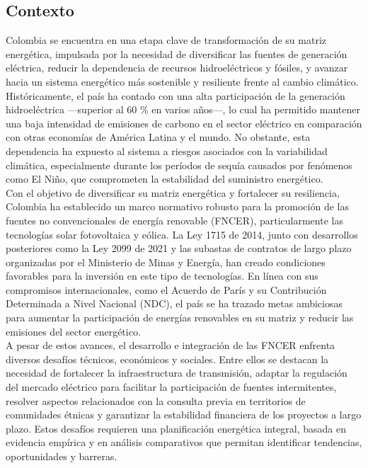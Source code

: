 \documentclass{article}
\begin{document}
\subsection{Contexto}

Colombia se encuentra en una etapa clave de transformación de su matriz energética, impulsada por la necesidad de diversificar las fuentes de generación eléctrica, reducir la dependencia de recursos hidroeléctricos y fósiles, y avanzar hacia un sistema energético más sostenible y resiliente frente al cambio climático. Históricamente, el país ha contado con una alta participación de la generación hidroeléctrica —superior al 60 \% en varios años—, lo cual ha permitido mantener una baja intensidad de emisiones de carbono en el sector eléctrico en comparación con otras economías de América Latina y el mundo. No obstante, esta dependencia ha expuesto al sistema a riesgos asociados con la variabilidad climática, especialmente durante los períodos de sequía causados por fenómenos como El Niño, que comprometen la estabilidad del suministro energético.\\

Con el objetivo de diversificar su matriz energética y fortalecer su resiliencia, Colombia ha establecido un marco normativo robusto para la promoción de las fuentes no convencionales de energía renovable (FNCER), particularmente las tecnologías solar fotovoltaica y eólica. La Ley 1715 de 2014, junto con desarrollos posteriores como la Ley 2099 de 2021 y las subastas de contratos de largo plazo organizadas por el Ministerio de Minas y Energía, han creado condiciones favorables para la inversión en este tipo de tecnologías. En línea con sus compromisos internacionales, como el Acuerdo de París y su Contribución Determinada a Nivel Nacional (NDC), el país se ha trazado metas ambiciosas para aumentar la participación de energías renovables en su matriz y reducir las emisiones del sector energético.\\

A pesar de estos avances, el desarrollo e integración de las FNCER enfrenta diversos desafíos técnicos, económicos y sociales. Entre ellos se destacan la necesidad de fortalecer la infraestructura de transmisión, adaptar la regulación del mercado eléctrico para facilitar la participación de fuentes intermitentes, resolver aspectos relacionados con la consulta previa en territorios de comunidades étnicas y garantizar la estabilidad financiera de los proyectos a largo plazo. Estos desafíos requieren una planificación energética integral, basada en evidencia empírica y en análisis comparativos que permitan identificar tendencias, oportunidades y barreras.\\
\end{document}
